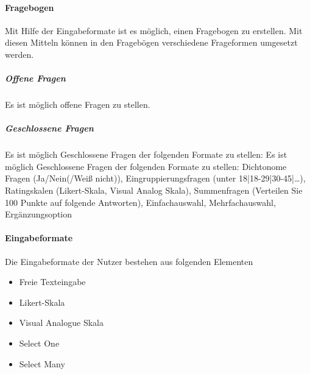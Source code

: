 \paragraph{Fragebogen}
Mit Hilfe der Eingabeformate ist es möglich, einen Fragebogen zu erstellen. Mit diesen Mitteln können in den Fragebögen verschiedene Frageformen umgesetzt werden.


\subparagraph{Offene Fragen} Es ist möglich offene Fragen zu stellen.
\subparagraph{Geschlossene Fragen} Es ist möglich Geschlossene Fragen der folgenden Formate zu stellen: Es ist möglich Geschlossene Fragen der folgenden Formate zu stellen: Dichtonome Fragen (Ja/Nein(/Weiß nicht)), Eingruppierungsfragen (unter 18|18-29|30-45|…), Ratingskalen (Likert-Skala, Visual Analog Skala), Summenfragen (Verteilen Sie 100 Punkte auf folgende Antworten), Einfachauswahl, Mehrfachauswahl, Ergänzungsoption


\paragraph{Eingabeformate} Die Eingabeformate der Nutzer	bestehen aus folgenden Elementen
\begin{itemize}
\item Freie Texteingabe
\item Likert-Skala
\item Visual Analogue Skala
\item Select One
\item Select Many
\end{itemize}

